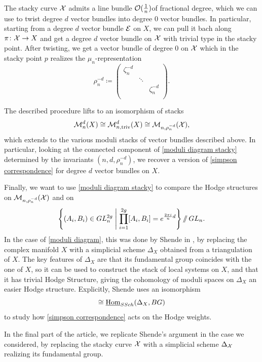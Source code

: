 \documentclass{article}
\begin{document}
The stacky curve $\mathcal{X}$ admits a line bundle $\mathcal{O}(\frac{1}{n})$of fractional degree, which we can use to twist degree $d$ vector bundles into degree $0$ vector bundles.
In particular, starting from a degree $d$ vector bundle $\mathcal{E}$ on $X$, we can pull it bach along $\pi\colon \mathcal{X} \to X$ and get a degree $d$ vector bundle on $\mathcal{X}$ with trivial type in the stacky point. After twisting, we get a vector bundle of degree $0$ on $\mathcal{X}$ which in the stacky point $p$ realizes the $\mu_n$-representation
\begin{equation}
\rho_n^{-d} \coloneqq 
\begin{pmatrix}
    \zeta_n^{-d} &  &  \\
     & \ddots &  \\
     &  & \zeta_n^{-d} \\
\end{pmatrix}.
\end{equation}

The described procedure lifts to an isomorphism of stacks
\begin{equation}
\mathcal{M}_n^d(X) \cong \mathcal{M}_{n, \text{triv}}^d(X) \cong \mathcal{M}_{n, \rho_n^{-d}}(\mathcal{X}),
\end{equation}
which extends to the various moduli stacks of vector bundles described above.
In particular, looking at the connected component of \eqref{moduli diagram stacky} determined by the invariants $(n, d, \rho_n^{-d})$, we recover a version of \eqref{simpson correspondence} for degree $d$ vector bundles on $X$.

Finally, we want to use \eqref{moduli diagram stacky} to compare the Hodge structures on $\mathcal{M}_{n, \rho_n^{-d}}(\mathcal{X})$ and on
\begin{equation}
\left\{ (A_i, B_i) \in GL_n^{2g} \;\middle|\; \prod_{i=1}^{2g}[A_i, B_i]=e^{\frac{2 \pi i}{n} d} \right\} /\!\!/ \, GL_n.
\end{equation}
In the case of \eqref{moduli diagram}, this was done by Shende in \cite[]{Shende-weights}, by replacing the complex manifold $X$ with a simplicial scheme $\Delta_X$ obtained from a triangulation of $X$. The key features of $\Delta_X$ are that its fundamental group coincides with the one of $X$, so it can be used to construct the stack of local systems on $X$, and that it has trivial Hodge Structure, giving the cohomology of moduli spaces on $\Delta_X$ an easier Hodge structure.
Explicitly, Shende uses an isomorphism
\begin{equation}
[\Hom(\pi_1(X), GL_n) / GL_n ] \cong \inHom_{SSch}(\Delta_X, BG)
\end{equation}
to study how \eqref{simpson correspondence} acts on the Hodge weights.

In the final part of the article, we replicate Shende's argument in the case we considered, by replacing the stacky curve $\mathcal{X}$ with a simplicial scheme $\Delta_{\mathcal{X}}$ realizing its fundamental group.


\printbibliography
\end{document}
